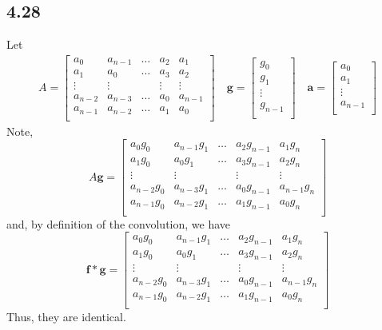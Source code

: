 \documentclass[letterpaper,12pt]{article}
\theoremstyle{definition}
\begin{document}
\subsection*{4.28}


Let 
\begin{align*}
A = \begin{bmatrix}
    a_0 & a_{n-1} & \dots & a_2 &a_1 \\
    a_1 & a_{0} & \dots & a_3 &a_2 \\
    \vdots & \vdots & & \vdots & \vdots\\
    a_{n-2} & a_{n-3} & \dots & a_0 &a_{n-1} \\
    a_{n-1} & a_{n-2} & \dots & a_1 &a_0 \\
\end{bmatrix} \quad
\mathbf{g} = \begin{bmatrix} g_0  \\
                 g_1  \\
                 \vdots \\
                 g_{n-1}\\
\end{bmatrix} \quad
\mathbf{a} = \begin{bmatrix} a_0  \\
                 a_1  \\
                 \vdots \\
                 a_{n-1}\\
\end{bmatrix}
\end{align*}
Note, 
\[A \mathbf{g} = 
\begin{bmatrix}
    a_0 g_0 & a_{n-1}g_1 & \dots & a_2g_{n-1} &a_1g_n \\
    a_1 g_0 & a_{0}  g_1 & \dots & a_3 g_{n-1} &a_2 g_n \\
    \vdots & \vdots & & \vdots & \vdots\\
    a_{n-2}g_0 & a_{n-3}g_1 & \dots & a_0g_{n-1} &a_{n-1}g_n \\
    a_{n-1} g_0& a_{n-2}g_1 & \dots & a_1g_{n-1} &a_0 g_n\\
\end{bmatrix} \]
and, by definition of the convolution, we have \[\mathbf{f}*\mathbf{g} =\begin{bmatrix}
    a_0 g_0 & a_{n-1}g_1 & \dots & a_2g_{n-1} &a_1g_n \\
    a_1 g_0 & a_{0}  g_1 & \dots & a_3 g_{n-1} &a_2 g_n \\
    \vdots & \vdots & & \vdots & \vdots\\
    a_{n-2}g_0 & a_{n-3}g_1 & \dots & a_0g_{n-1} &a_{n-1}g_n \\
    a_{n-1} g_0& a_{n-2}g_1 & \dots & a_1g_{n-1} &a_0 g_n\\
\end{bmatrix}\]
Thus, they are identical.
\end{document}
